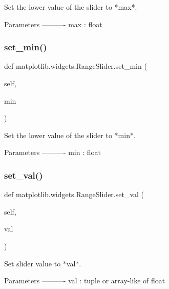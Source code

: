 \begin{DoxyVerb}Set the lower value of the slider to *max*.

Parameters
----------
max : float
\end{DoxyVerb}
 \mbox{\label{classmatplotlib_1_1widgets_1_1RangeSlider_aa1429e9f0f6f9d87e1e7fcc59061270f}} 
\subsubsection{\texorpdfstring{set\+\_\+min()}{set\_min()}}
{\footnotesize\ttfamily def matplotlib.\+widgets.\+Range\+Slider.\+set\+\_\+min (\begin{DoxyParamCaption}\item[{}]{self,  }\item[{}]{min }\end{DoxyParamCaption})}

\begin{DoxyVerb}Set the lower value of the slider to *min*.

Parameters
----------
min : float
\end{DoxyVerb}
 \mbox{\label{classmatplotlib_1_1widgets_1_1RangeSlider_a9d36dcc7c304e7c974435b65a63385da}} 
\subsubsection{\texorpdfstring{set\+\_\+val()}{set\_val()}}
{\footnotesize\ttfamily def matplotlib.\+widgets.\+Range\+Slider.\+set\+\_\+val (\begin{DoxyParamCaption}\item[{}]{self,  }\item[{}]{val }\end{DoxyParamCaption})}

\begin{DoxyVerb}Set slider value to *val*.

Parameters
----------
val : tuple or array-like of float
\end{DoxyVerb}
 

